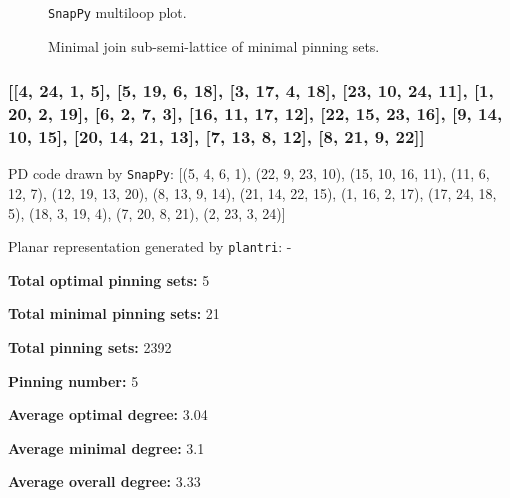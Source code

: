 \documentclass{article}%
\begin{document}
\begin{multicols}{2}
\begin{figure}[H]
\centering

\caption{\texttt{SnapPy} multiloop plot.}
\label{fig:tex/img/[[24, 13, 1, 14], [14, 7, 15, 8], [8, 23, 9, 24], [19, 12, 20, 13], [1, 20, 2, 21], [21, 6, 22, 7], [15, 22, 16, 23], [9, 5, 10, 4], [18, 3, 19, 4], [11, 2, 12, 3], [5, 16, 6, 17], [10, 17, 11, 18]].svg}
\end{figure}
\columnbreak

\begin{figure}[H]
\centering
\scalebox{0.8}{}
\caption{Minimal join sub-semi-lattice of minimal pinning sets.}
\label{fig:tex/img/[[24, 13, 1, 14], [14, 7, 15, 8], [8, 23, 9, 24], [19, 12, 20, 13], [1, 20, 2, 21], [21, 6, 22, 7], [15, 22, 16, 23], [9, 5, 10, 4], [18, 3, 19, 4], [11, 2, 12, 3], [5, 16, 6, 17], [10, 17, 11, 18]].pgf}
\end{figure}
\end{multicols}

\newpage

\subsubsection{[[4, 24, 1, 5], [5, 19, 6, 18], [3, 17, 4, 18], [23, 10, 24, 11], [1, 20, 2, 19], [6, 2, 7, 3], [16, 11, 17, 12], [22, 15, 23, 16], [9, 14, 10, 15], [20, 14, 21, 13], [7, 13, 8, 12], [8, 21, 9, 22]]}

{\small\noindent PD code drawn by \texttt{SnapPy}: [(5, 4, 6, 1), (22, 9, 23, 10), (15, 10, 16, 11), (11, 6, 12, 7), (12, 19, 13, 20), (8, 13, 9, 14), (21, 14, 22, 15), (1, 16, 2, 17), (17, 24, 18, 5), (18, 3, 19, 4), (7, 20, 8, 21), (2, 23, 3, 24)]}

{\small\noindent Planar representation generated by \texttt{plantri}: -}

\begin{multicols}{2}
{\normalsize \noindent\textbf{Total optimal pinning sets:} 5

\noindent\textbf{Total minimal pinning sets:} 21

\noindent\textbf{Total pinning sets:} 2392

\noindent\textbf{Pinning number:} 5

}
\columnbreak

{\normalsize \noindent\textbf{Average optimal degree:} 3.04

\noindent\textbf{Average minimal degree:} 3.1

\noindent\textbf{Average overall degree:} 3.33

}
\end{multicols}
\end{document}
